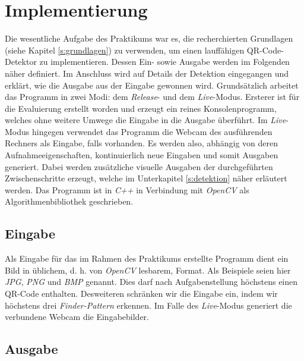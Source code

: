 \documentclass[a4paper, oneside, 12pt]{article}
\begin{document}
\newpage

\section{Implementierung}
\label{s:implementierung}

Die wesentliche Aufgabe des Praktikums war es, die recherchierten Grundlagen (siehe Kapitel \ref{s:grundlagen}) zu verwenden, um einen lauffähigen QR-Code-Detektor zu implementieren. Dessen Ein- sowie Ausgabe werden im Folgenden näher definiert.
Im Anschluss wird auf Details der Detektion eingegangen und erklärt, wie die Ausgabe aus der Eingabe gewonnen wird.
Grundsätzlich arbeitet das Programm in zwei Modi: dem \emph{Release}- und dem \emph{Live}-Modus.
Ersterer ist für die Evaluierung erstellt worden und erzeugt ein reines Konsolenprogramm, welches ohne weitere Umwege die Eingabe in die Ausgabe überführt.
Im \emph{Live}-Modus hingegen verwendet das Programm die Webcam des ausführenden Rechners als Eingabe, falls vorhanden. Es werden also, abhängig von deren Aufnahmeeigenschaften, kontinuierlich neue Eingaben und somit Ausgaben generiert. Dabei werden zusätzliche visuelle Ausgaben der durchgeführten Zwischenschritte erzeugt, welche im Unterkapitel \ref{s:detektion} näher erläutert werden.
Das Programm ist in \emph{C++} \cite{stroustrup1995c++} in Verbindung mit \emph{OpenCV} \cite{bradski2008learning} als Algorithmenbibliothek geschrieben.

\subsection{Eingabe}
\label{s:eingabe}

Als Eingabe für das im Rahmen des Praktikums erstellte Programm dient ein Bild in üblichem, d. h. von \emph{OpenCV} lesbarem, Format. Als Beispiele seien hier \emph{JPG}, \emph{PNG} und \emph{BMP} genannt.
Dies darf nach Aufgabenstellung höchstens einen QR-Code enthalten.
Desweiteren schränken wir die Eingabe ein, indem wir höchstens drei \emph{Finder-Pattern} erkennen.
Im Falle des \emph{Live}-Modus generiert die verbundene Webcam die Eingabebilder.

\subsection{Ausgabe}
\label{s:ausgabe}
\end{document}
